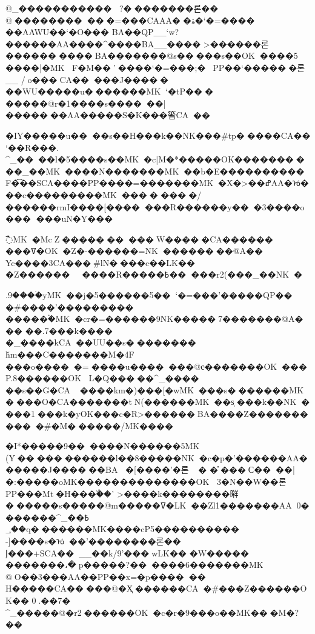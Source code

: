 {{{{{{{ @_����������� ?��������론�� @�����������=���CAAA��ۿ�`�=����	��AAWU��`�O���
BA��QP__`w?������AA ����^����BA__���� >������론����������BA�������@s�����s��OK����5	����|�MK F�M��' ����`�=���;� PP��`����� �론__ /o���CA�����J�����
��WU�����u�������MK`�tP���
����  �@r�1����s������|�������AA�����S�K���箵CA��{�IY�����u����s��H���k��NK���#tp����{�}CA��`��R���.
^_����l�5����s��MK�c|M�*�����OK����������_��MK����N�������MK��b�E���������� F\t���SCA����PP����=�������MK�X�>��ߝAA�ᡠ��� c���������MK����	����/������rmI����[����� ��R������y���3����o���
  ��� uN�Y���{߯MK�McZ����������W�����CA������	���ߜ�OK� Z�-������=NK��������@A�� Yc����3CA���𯯀#lN����c��LK�� �Z������ ����R�����߿�����r2(���_��NK� {.9����ۛyMK��j�5������5��`�=���'�����QP�� �#����'��������� {
�����۬�MK�cr�=������9NK�����7�������@A���
��.7���k���� �_����kCA��UU��s�������� ȟm���C������  �M�4F	���o�����=����u�������@c̵�������OK���P.8������OK L�Q�����^_���� ��s��G�CA����km�)���[�wMK���s�������MK ����O�CA������� tN(������MK��s̩���k��NK����1���k�yOK���c�R>������BA����Z��������}���#�M������/MK����{�I*�����9������N������5MK (Y����� ������l��8�����NK�c�p�'������AA������J������BA �[����'�론�
�̽���Ϲ����|�:�����oMK��������������OK 3�N��W��론PP���Mt�H���ۜ��῾ >����k�����  ���㬕������s�����@{m�����ߜ�LK��Zl1�������AA0�������^_߿��
؀��q�������MK����cP5���������� -]����s�ᡠ  ��'��������론�� إ���+SCA��__��k/9'���۝wLK�� �W�����
�������،�p�����?������6�������MK @O��3���AA��PP��x=�p������ H�����CA�� ���@�Ҳ������CA�#���Z������OK�� 0.��7�
^_�����@�r2������OK�c�r�9���o��MK���M�?}��

}}}}}}}}}}}
